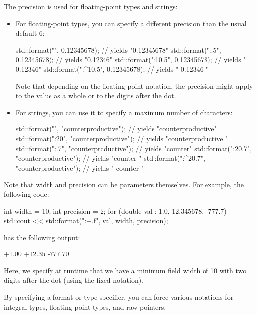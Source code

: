The precision is used for floating-point types and strings:

\begin{itemize}
\item 
For floating-point types, you can specify a different precision than the usual default 6:

\begin{cpp}
std::format("{}", 0.12345678);         // yields "0.12345678"
std::format("{:.5}", 0.12345678);      // yields "0.12346"
std::format("{:10.5}", 0.12345678);    // yields "   0.12346"
std::format("{:^10.5}", 0.12345678);   // yields " 0.12346  "
\end{cpp}

Note that depending on the floating-point notation, the precision might apply to the value as a whole or to the digits after the dot.

\item 
For strings, you can use it to specify a maximum number of characters:

\begin{cpp}
std::format("{}", "counterproductive");            // yields "counterproductive"
std::format("{:20}", "counterproductive");         // yields "counterproductive    "
std::format("{:.7}", "counterproductive");         // yields "counter"
std::format("{:20.7}", "counterproductive");       // yields "counter              "
std::format("{:^20.7}", "counterproductive");      // yields "        counter      "
\end{cpp}
\end{itemize}

Note that width and precision can be parameters themselves. For example, the following code:

\begin{cpp}
int width = 10;
int precision = 2;
for (double val : {1.0, 12.345678, -777.7}) {
	std::cout << std::format("{:+{}.{}f}\n", val, width, precision);
}
\end{cpp}

has the following output:

\begin{shell}
    +1.00
   +12.35
  -777.70
\end{shell}

Here, we specify at runtime that we have a minimum field width of 10 with two digits after the dot (using the fixed notation).


By specifying a format or type specifier, you can force various notations for integral types, floating-point types, and raw pointers.

